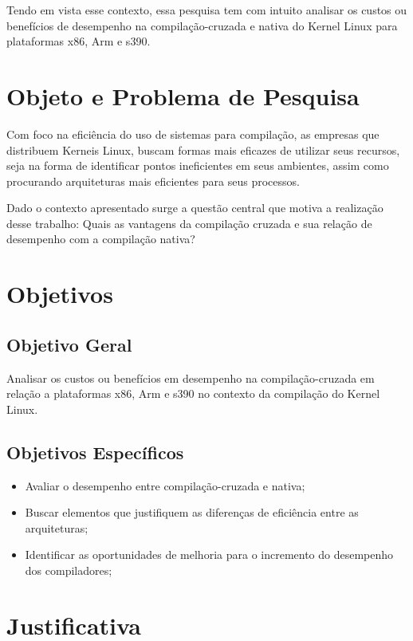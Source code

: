\documentclass[twoside,english,brazilian]{UNISINOSmonografia}
\begin{document}
Tendo em vista esse contexto, essa pesquisa tem com intuito analisar os custos ou benefícios de desempenho na compilação-cruzada e nativa do Kernel Linux para plataformas x86, Arm e s390.

\section{Objeto e Problema de Pesquisa}

Com foco na eficiência do uso de sistemas para compilação, as empresas que distribuem Kerneis Linux, buscam formas mais eficazes de utilizar seus recursos, seja na forma de identificar pontos ineficientes em seus ambientes, assim como procurando arquiteturas mais eficientes para seus processos.

Dado o contexto apresentado surge a questão central que motiva a realização
desse trabalho: Quais as vantagens da compilação cruzada e sua relação de desempenho com a compilação nativa?

\section{Objetivos}
\subsection{Objetivo Geral}
Analisar os custos ou benefícios em desempenho na compilação-cruzada  em relação a  plataformas x86, Arm e s390 no contexto da compilação do Kernel Linux.

\subsection{Objetivos Específicos}
\begin{itemize}
    \item Avaliar o desempenho entre compilação-cruzada e nativa;
    \item Buscar elementos que justifiquem as diferenças de eficiência entre as arquiteturas;
    \item Identificar as oportunidades de melhoria para o incremento do desempenho dos compiladores;
\end{itemize}

\section{Justificativa}
\end{document}
